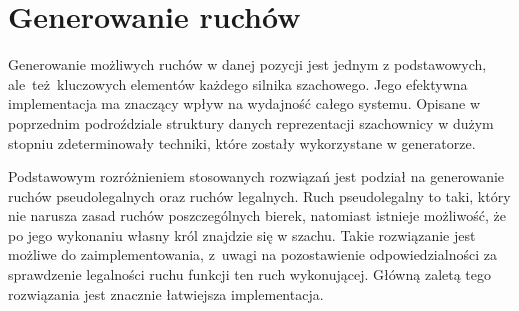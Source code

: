 \section{Generowanie ruchów}
\label{sec:generowanie-ruchow}

Generowanie możliwych ruchów w danej pozycji jest jednym z podstawowych, ale~też~kluczowych elementów każdego silnika szachowego.
Jego efektywna implementacja ma znaczący wpływ na wydajność całego systemu.
Opisane w poprzednim podroździale struktury danych reprezentacji szachownicy w dużym stopniu zdeterminowały techniki, które zostały wykorzystane w generatorze.

Podstawowym rozróżnieniem stosowanych rozwiązań jest podział na generowanie ruchów pseudolegalnych oraz ruchów legalnych.
Ruch pseudolegalny to taki, który nie narusza zasad ruchów poszczególnych bierek, natomiast istnieje możliwość, że po jego wykonaniu własny król znajdzie się w szachu.
Takie rozwiązanie jest możliwe do zaimplementowania, z~uwagi na pozostawienie odpowiedzialności za sprawdzenie legalności ruchu funkcji ten ruch wykonującej.
Główną zaletą tego rozwiązania jest znacznie łatwiejsza implementacja.




